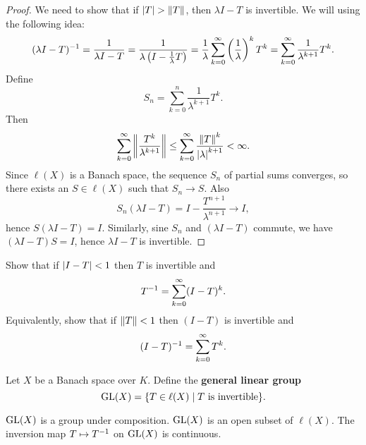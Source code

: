 \begin{proof}
  We need to show that if $\left\lvert T \right\rvert>\left\lVert T \right\rVert$, then $\lambda I-T$ is invertible.
  We will using the following idea:
  \[ (\lambda I-T)^{-1} = \frac{1}{\lambda I-T} = \frac{1}{\lambda \left( I-\frac{1}{\lambda}T \right)} = \frac{1}{\lambda} \sum_{k=0}^\infty \left( \frac{1}{\lambda} \right)^k T^k = \sum_{k=0}^\infty \frac{1}{\lambda^{k+1}}T^k. \]
  Define
  \[ S_n = \sum_{k=0}^n \frac{1}{\lambda^{k+1}}T^k. \]
  Then
  \[ \sum_{k=0}^\infty \left\lVert  \frac{T^k}{\lambda^{k+1}}  \right\rVert \leq \sum_{k=0}^\infty \frac{\left\lVert T \right\rVert^k}{\left\lvert \lambda \right\rvert^{k+1}} < \infty. \]
  Since $\ell(X)$ is a Banach space, the sequence $S_n$ of partial sums converges, so there exists an $S \in \ell(X)$ such that $S_n \to S$.
  Also
  \[ S_n(\lambda I-T) = I - \frac{T^{n+1}}{\lambda^{n+1}} \to I, \]
  hence $S(\lambda I-T) = I$.
  Similarly, sine $S_n$ and $(\lambda I-T)$ commute, we have $(\lambda I-T)S=I$, hence $\lambda I-T$ is invertible.
\end{proof}

\begin{exer}\label{18:exer}
  Show that if $\left\lvert I-T \right\rvert<1$ then $T$ is invertible and
  \[ T^{-1} = \sum_{k=0}^\infty (I-T)^k. \]
  Equivalently, show that if $\left\lVert T \right\rVert<1$ then $(I-T)$ is invertible and
  \[ (I-T)^{-1} = \sum_{k=0}^\infty T^k. \]
\end{exer}

\begin{defn}
  Let $X$ be a Banach space over $K$.
  Define the \textbf{general linear group}
  \[ \operatorname{GL}(X) = \{ T \in \ell(X) \mid T \text{ is invertible} \}. \]
\end{defn}

\begin{prop}
  \leavevmode
  \begin{enum}
    \io $\operatorname{GL}(X)$ is a group under composition.
    \io $\operatorname{GL}(X)$ is an open subset of $\ell(X)$.
    \io The inversion map $T \mapsto T^{-1}$ on $\operatorname{GL}(X)$ is continuous.
  \end{enum}
\end{prop}

